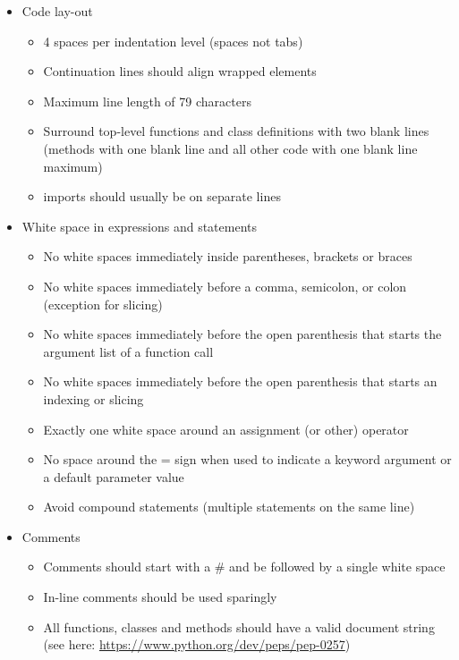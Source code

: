 \begin{itemize}
	\item Code lay-out
	\begin{itemize}
		\item 4 spaces per indentation level (spaces not tabs)
		\item Continuation lines should align wrapped elements
		\item Maximum line length of 79 characters
		\item Surround top-level functions and class definitions with two blank lines (methods with one blank line and all other code with one blank line maximum)
		\item imports should usually be on separate lines
	\end{itemize}

	\item White space in expressions and statements
	\begin{itemize}
		\item No white spaces immediately inside parentheses, brackets or braces
		\item No white spaces immediately before a comma, semicolon, or colon (exception for slicing)
		\item No white spaces immediately before the open parenthesis that starts the argument list of a function call
		\item No white spaces immediately before the open parenthesis that starts an indexing or slicing
		\item Exactly one white space around an assignment (or other) operator
		\item No space around the = sign when used to indicate a keyword argument or a default parameter value
		\item Avoid compound statements (multiple statements on the same line)
	\end{itemize}

	\item Comments
	\begin{itemize}
		\item Comments should start with a \# and be followed by a single white space
		\item In-line comments should be used sparingly
		\item All functions, classes and methods should have a valid document string (see here: \url{https://www.python.org/dev/peps/pep-0257})
	\end{itemize}


\end{itemize}

